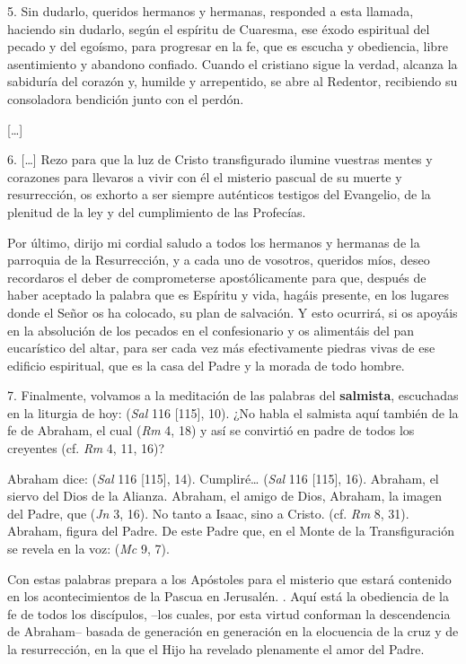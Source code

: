 \begin{body}
5. Sin dudarlo, queridos hermanos y hermanas, responded a esta llamada, haciendo sin dudarlo, según el espíritu de Cuaresma, ese éxodo espiritual del pecado y del egoísmo, para progresar en la fe, que es escucha y obediencia, libre asentimiento y abandono confiado. Cuando el cristiano sigue la verdad, alcanza la sabiduría del corazón y, humilde y arrepentido, se abre al Redentor, recibiendo su consoladora bendición junto con el perdón.

[\ldots]

6. [\ldots] Rezo para que la luz de Cristo transfigurado ilumine vuestras mentes y corazones para llevaros a vivir con él el misterio pascual de su muerte y resurrección, os exhorto a ser siempre auténticos testigos del Evangelio, de la plenitud de la ley y del cumplimiento de las Profecías.

Por último, dirijo mi cordial saludo a todos los hermanos y hermanas de la parroquia de la Resurrección, y a cada uno de vosotros, queridos míos, deseo recordaros el deber de comprometerse apostólicamente para que, después de haber aceptado la palabra que es Espíritu y vida, hagáis presente, en los lugares donde el Señor os ha colocado, su plan de salvación. Y esto ocurrirá, si os apoyáis en la absolución de los pecados en el confesionario y os alimentáis del pan eucarístico del altar, para ser cada vez más efectivamente piedras vivas de ese edificio espiritual, que es la casa del Padre y la morada de todo hombre.

\txtsmall{[\ldots]}

7. Finalmente, volvamos a la meditación de las palabras del \textbf{salmista}, escuchadas en la liturgia de hoy:  (\textit{Sal} 116 [115], 10). ¿No habla el salmista aquí también de la fe de Abraham, el cual  (\textit{Rm} 4, 18) y así se convirtió en padre de todos los creyentes (cf. \textit{Rm} 4, 11, 16)?

Abraham dice:  (\textit{Sal} 116 [115], 14). Cumpliré\ldots {} (\textit{Sal} 116 [115], 16). Abraham, el siervo del Dios de la Alianza. Abraham, el amigo de Dios, Abraham, la imagen del Padre, que  (\textit{Jn} 3, 16). No tanto a Isaac, sino a Cristo.  (cf. \textit{Rm} 8, 31). Abraham, figura del Padre. De este Padre que, en el Monte de la Transfiguración se revela en la voz:  (\textit{Mc} 9, 7).

Con estas palabras prepara a los Apóstoles para el misterio que estará contenido en los acontecimientos de la Pascua en Jerusalén. . Aquí está la obediencia de la fe de todos los discípulos, –los cuales, por esta virtud conforman la descendencia de Abraham– basada de generación en generación en la elocuencia de la cruz y de la resurrección, en la que el Hijo ha revelado plenamente el amor del Padre.
\end{body}

